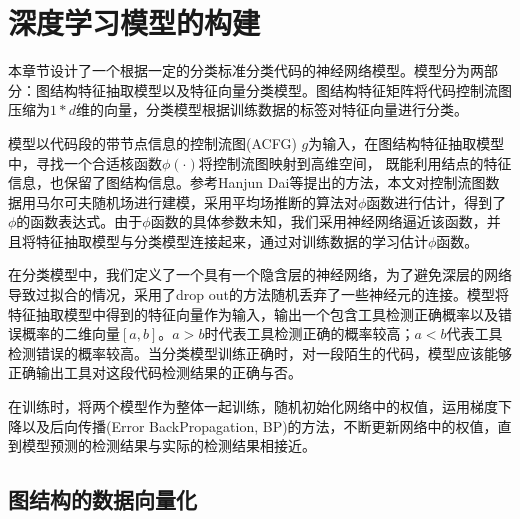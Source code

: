 \chapter{深度学习模型的构建}
本章节设计了一个根据一定的分类标准分类代码的神经网络模型。模型分为两部分：图结构特征抽取模型以及特征向量分类模型。图结构特征矩阵将代码控制流图压缩为$1*d$维的向量，分类模型根据训练数据的标签对特征向量进行分类。
\par 模型以代码段的带节点信息的控制流图(ACFG) $g$为输入，在图结构特征抽取模型中，寻找一个合适核函数$\phi(\cdot)$将控制流图映射到高维空间， 既能利用结点的特征信息，也保留了图结构信息。参考Hanjun Dai\cite{dai2016discriminative}等提出的方法，本文对控制流图数据用马尔可夫随机场进行建模，采用平均场推断的算法对$\phi$函数进行估计，得到了$\phi$的函数表达式。由于$\phi$函数的具体参数未知，我们采用神经网络逼近该函数，并且将特征抽取模型与分类模型连接起来，通过对训练数据的学习估计$\phi$函数。
\par 在分类模型中，我们定义了一个具有一个隐含层的神经网络，为了避免深层的网络导致过拟合的情况，采用了drop out的方法随机丢弃了一些神经元的连接。模型将特征抽取模型中得到的特征向量作为输入，输出一个包含工具检测正确概率以及错误概率的二维向量$[a, b]$。$a>b$时代表工具检测正确的概率较高；$a<b$代表工具检测错误的概率较高。当分类模型训练正确时，对一段陌生的代码，模型应该能够正确输出工具对这段代码检测结果的正确与否。
\par 在训练时，将两个模型作为整体一起训练，随机初始化网络中的权值，运用梯度下降以及后向传播(Error BackPropagation, BP)的方法，不断更新网络中的权值，直到模型预测的检测结果与实际的检测结果相接近。
\label{chap:deeplearning}
\section{图结构的数据向量化}
